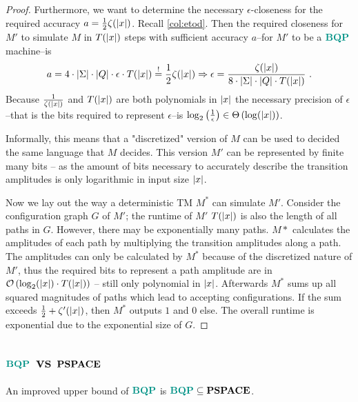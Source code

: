 \begin{theorem}
\begin{proof}
Furthermore, we want to determine the necessary $\epsilon$-closeness for the required accuracy $a=\frac{1}{2}\zeta(\left\vert x\right\vert)$.
Recall \cref{col:etod}.
Then the required closeness for $M'$ to simulate $M$ in $T(\left\vert x\right\vert)$ steps with sufficient accuracy $a$--for $M'$ to be a $\BQP$ machine--is
\begin{equation}
    a
    =4\cdot\left\vert\Sigma\right\vert\cdot\left\vert Q\right\vert\cdot\epsilon\cdot T(\left\vert x\right\vert)
    \overset{!}{=}\frac{1}{2}\zeta(\left\vert x\right\vert)
    \Rightarrow
    \epsilon
    =\frac{\zeta(\left\vert x\right\vert)}{8\cdot\left\vert\Sigma\right\vert\cdot\left\vert Q\right\vert\cdot T(\left\vert x\right\vert)}
    \ .
\end{equation}
Because $\frac{1}{\zeta(\left\vert x\right\vert)}$ and $T(\left\vert x\right\vert)$ are both polynomials in $\left\vert x\right\vert$ the necessary precision of $\epsilon$--that is the bits required to represent $\epsilon$--is $\log_2\left(\frac{1}{\epsilon}\right)\in\Theta\left(\log(\left\vert x\right\vert)\right)$.

Informally, this means that a "discretized" version of $M$ can be used to decided the same language that $M$ decides.
This version $M'$ can be represented by finite many bits -- as the amount of bits necessary to accurately describe the transition amplitudes is only logarithmic in input size $\left\vert x\right\vert$.

Now we lay out the way a deterministic \ac{TM} $M^*$ can simulate $M'$.
Consider the configuration graph $G$ of $M'$; the runtime of $M'$ $T(\left\vert x\right\vert)$ is also the length of all paths in $G$.
However, there may be exponentially many paths.
$M*$ calculates the amplitudes of each path by multiplying the transition amplitudes along a path.
The amplitudes can only be calculated by $M^*$ because of the discretized nature of $M'$, thus the required bits to represent a path amplitude are in $\mathcal{O}\left(\log_2(\left\vert x\right\vert)\cdot T(\left\vert x\right\vert)\right)$ -- still only polynomial in $\left\vert x\right\vert$.
Afterwards $M^*$ sums up all squared magnitudes of paths which lead to accepting configurations.
If the sum exceeds $\frac{1}{2}+\zeta'(\left\vert x\right\vert)$, then $M^*$ outputs $1$ and $0$ else.
The overall runtime is exponential due to the exponential size of $G$.
\end{proof}
\end{theorem}

\subsection{$\BQP$ vs $\mathbf{PSPACE}$}
An improved upper bound of $\BQP$ is $\BQP\subseteq\PSPACE$.

